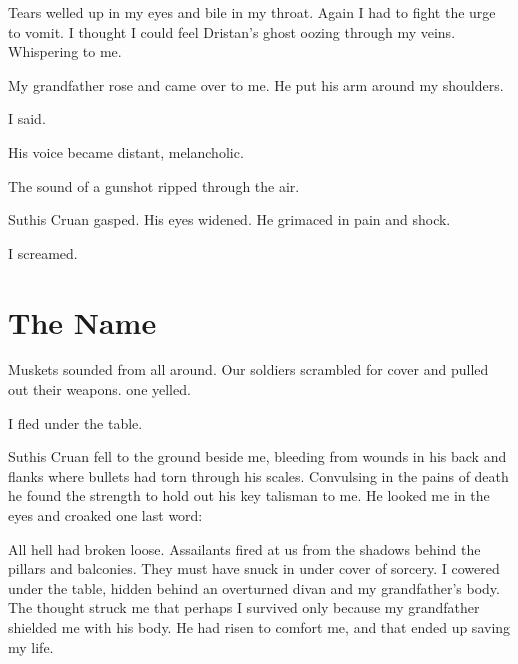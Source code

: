\documentclass
  [a4paper,
   12pt,
   oneside
  ]%
  {article}
\begin{document}
Tears welled up in my eyes and bile in my throat.
Again I had to fight the urge to vomit. 
I thought I could feel Dristan's ghost oozing through my veins.
Whispering to me.

My grandfather rose and came over to me. 
He put his arm around my shoulders.

 I said. 

His voice became distant, melancholic.


The sound of a gunshot ripped through the air.

Suthis Cruan gasped. 
His eyes widened.
He grimaced in pain and shock. 

I screamed. 









\section{The Name}
Muskets sounded from all around. 
Our soldiers scrambled for cover and pulled out their weapons. 
 one yelled.

I fled under the table. 

Suthis Cruan fell to the ground beside me, bleeding from wounds in his back and flanks where bullets had torn through his scales. 
Convulsing in the pains of death he found the strength to hold out his key talisman to me. 
He looked me in the eyes and croaked one last word:


All hell had broken loose.
Assailants fired at us from the shadows behind the pillars and balconies. 
They must have snuck in under cover of sorcery.
I cowered under the table, hidden behind an overturned divan and my grandfather's body. 
The thought struck me that perhaps I survived only because my grandfather shielded me with his body. 
He had risen to comfort me, and that ended up saving my life.
\end{document}
